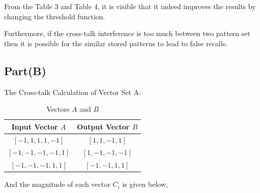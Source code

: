 \documentclass[12pt]{article}
\begin{document}
From the Table 3 and Table 4, it is visible that it indeed improves the results by changing the threshold function. 

Furthermore, if the cross-talk interference is too much between two pattern set then it is possible for the similar stored patterns to lead to false recalls. 

\break
\subsection{Part(B)}
The Cross-talk Calculation of Vector Set A:

\begin{table}[ht]
    \centering
    \caption{Vectors \( A \) and \( B \)}
    \begin{tabular}{|c|c|}
        \hline
        \textbf{Input Vector \( A \)} & \textbf{Output Vector \( B \)} \\ \hline
        $[-1, 1, 1, 1, -1]$ & $[1, 1, -1, 1]$ \\ \hline
        $[-1, -1, -1, -1, 1]$ & $[1, -1, -1, -1]$ \\ \hline
        $[-1, -1, -1, 1, 1]$ & $[-1, -1, 1, 1]$ \\ \hline
    \end{tabular}
\end{table}

And the magnitude of each vector ${C_i}$ is given below,
\end{document}

